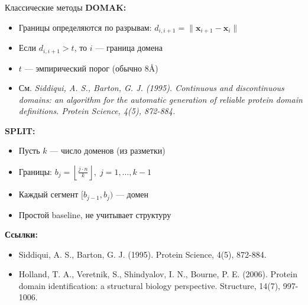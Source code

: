 \documentclass{beamer}
\begin{document}
\begin{frame}{Классические методы}
  \textbf{DOMAK:}
  \begin{itemize}
    \item Границы определяются по разрывам: $d_{i,i+1} = \|\mathbf{x}_{i+1} - \mathbf{x}_i\|$
    \item Если $d_{i,i+1} > t$, то $i$ — граница домена
    \item $t$ — эмпирический порог (обычно 8\AA)
    \item См. \textit{Siddiqui, A. S., Barton, G. J. (1995). Continuous and discontinuous domains: an algorithm for the automatic generation of reliable protein domain definitions. Protein Science, 4(5), 872-884.}
  \end{itemize}
  \vspace{0.5em}
  \textbf{SPLIT:}
  \begin{itemize}
    \item Пусть $k$ — число доменов (из разметки)
    \item Границы: $b_j = \left\lfloor \frac{j \cdot n}{k} \right\rfloor,\; j=1,\ldots,k-1$
    \item Каждый сегмент $[b_{j-1}, b_j)$ — домен
    \item Простой baseline, не учитывает структуру
  \end{itemize}
  \vspace{0.5em}
  \textbf{Ссылки:}
  \begin{itemize}
    \item \footnotesize Siddiqui, A. S., Barton, G. J. (1995). Protein Science, 4(5), 872-884.
    \item \footnotesize Holland, T. A., Veretnik, S., Shindyalov, I. N., Bourne, P. E. (2006). Protein domain identification: a structural biology perspective. Structure, 14(7), 997-1006.
  \end{itemize}
\end{frame}
\end{document}
